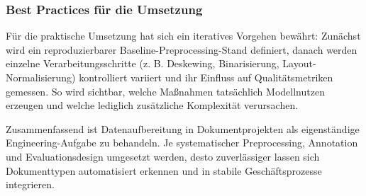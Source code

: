 \subsubsection{Best Practices für die Umsetzung}

Für die praktische Umsetzung hat sich ein iteratives Vorgehen bewährt: Zunächst wird ein reproduzierbarer Baseline-Preprocessing-Stand definiert, danach werden einzelne Verarbeitungsschritte (z. B. Deskewing, Binarisierung, Layout-Normalisierung) kontrolliert variiert und ihr Einfluss auf Qualitätsmetriken gemessen. 
So wird sichtbar, welche Maßnahmen tatsächlich Modellnutzen erzeugen und welche lediglich zusätzliche Komplexität verursachen. \cite{tesseract_improve_quality} \cite{layoutlmv2_2021}

Zusammenfassend ist Datenaufbereitung in Dokumentprojekten als eigenständige Engineering-Aufgabe zu behandeln. 
Je systematischer Preprocessing, Annotation und Evaluationsdesign umgesetzt werden, desto zuverlässiger lassen sich Dokumenttypen automatisiert erkennen und in stabile Geschäftsprozesse integrieren. \cite{shaip2025dokumentenklassifizierung} \cite{sklearn_cross_validation}
